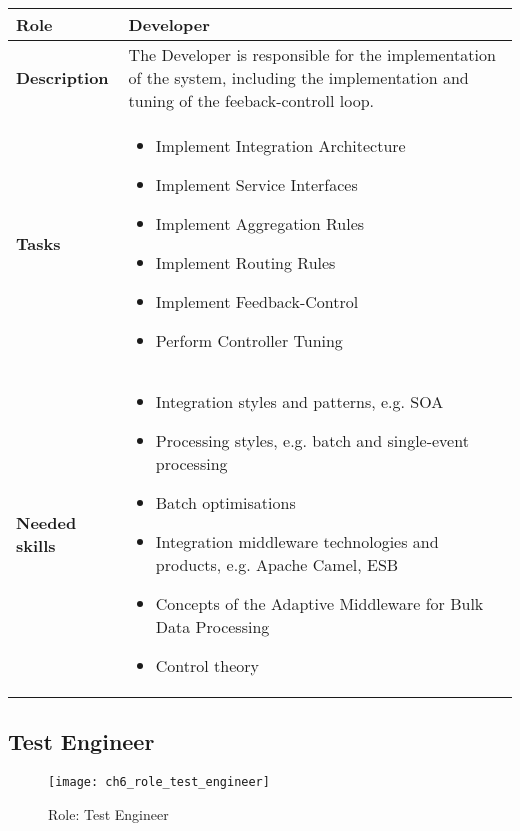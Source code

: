 \begin{tabularx}{\textwidth}{@{} l X @{}}
	\caption{Software Engineer} \label{table:ch6_Role_Developer}\\
	\toprule 
	\bfseries Role & Developer\\
	\midrule
	\bfseries Description & The Developer is responsible for the implementation of the system, including the implementation and tuning of the feeback-controll loop.\\
	\midrule
	\bfseries Tasks & 
	\begin{itemize}
		\item Implement Integration Architecture
		\item Implement Service Interfaces
		\item Implement Aggregation Rules
		\item Implement Routing Rules
		\item Implement Feedback-Control
		\item Perform Controller Tuning
	\end{itemize}
	\\
	\midrule 
	\bfseries Needed skills &
	\begin{itemize}
		\item Integration styles and patterns, e.g. \ac{SOA}
		\item Processing styles, e.g. batch and single-event processing
		\item Batch optimisations
		\item Integration middleware technologies and products, e.g. Apache Camel, \ac{ESB}
		\item Concepts of the Adaptive Middleware for Bulk Data Processing
		\item Control theory
	\end{itemize}
	\\
	\bottomrule
\end{tabularx}


\subsection{Test Engineer}

\begin{figure}[htpb] \centering 
	\texttt{[image: ch6\_role\_test\_engineer]} 
	\caption{Role: Test Engineer} 
	\label{fig:ch6_role_test_engineer} 
\end{figure}


